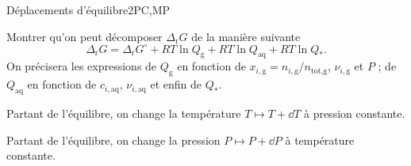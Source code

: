 \begin{exercise}{Déplacements d'équilibre}{2}{PC,MP}
\begin{questions}
    \question Montrer qu'on peut décomposer $\Delta_\text{r}G$ de la manière suivante
    \begin{equation}
        \Delta_\text{r}G = \Delta_\text{r}G^\circ + RT\ln Q_\text{g} + RT\ln Q_\text{aq} + RT\ln Q_\ast. \tag{$\star$}
    \end{equation}
        On précisera les expressions de $Q_\text{g}$ en fonction de $x_{i,\text{g}} = n_{i,\text{g}}/n_\text{tot,g}$, $\nu_{i,\text{g}}$ et $P$ ; de $Q_\text{aq}$ en fonction de $c_{i,\text{aq}}$, $\nu_{i,\text{aq}}$ et enfin de $Q_\ast$.
    
    \question Partant de l'équilibre, on change la température $T \mapsto T + \dd{T}$ à pression constante.
    
    \question Partant de l'équilibre, on change la pression $P \mapsto P + \dd{P}$ à température constante.
\end{questions}
\end{exercise}

